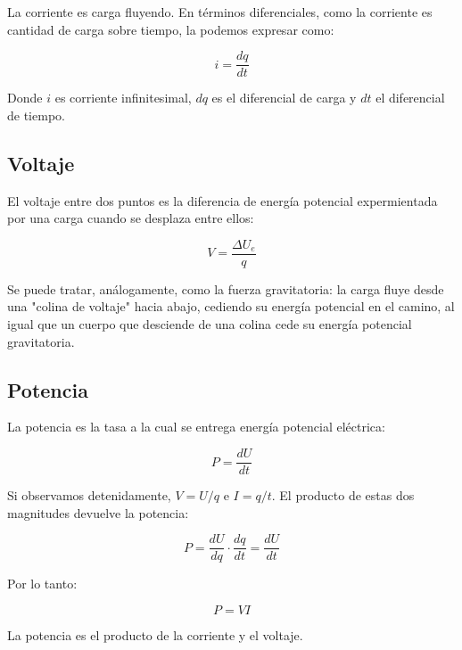 La corriente es carga fluyendo.
En términos diferenciales,
como la corriente es cantidad de carga sobre tiempo, 
la podemos expresar como:

\begin{equation*}
    i = \frac{dq}{dt}
\end{equation*}

Donde \(i\) es corriente infinitesimal,
\(dq\) es el diferencial de carga y \(dt\) el diferencial de tiempo.

\subsection{Voltaje}

El voltaje entre dos puntos es la diferencia de energía potencial 
expermientada por una carga cuando se desplaza entre ellos:

\begin{equation*}
    V = \frac{\Delta U_e}{q}
\end{equation*}

Se puede tratar, análogamente,
como la fuerza gravitatoria:
la carga fluye desde una "colina de voltaje" hacia abajo,
cediendo su energía potencial en el camino,
al igual que un cuerpo que desciende de una colina 
cede su energía potencial gravitatoria.

\subsection{Potencia}

La potencia es la tasa a la cual se entrega energía potencial eléctrica:

\begin{equation*}
    P = \frac{dU}{dt}
\end{equation*}

Si observamos detenidamente, \(V = U/q\) e \(I = q/t\).
El producto de estas dos magnitudes devuelve la potencia:

\begin{equation*}
    P = \frac{dU}{dq} \cdot \frac{dq}{dt} = \frac{dU}{dt}
\end{equation*}

Por lo tanto:

\begin{equation*}
    P = VI
\end{equation*}

La potencia es el producto de la corriente y el voltaje.